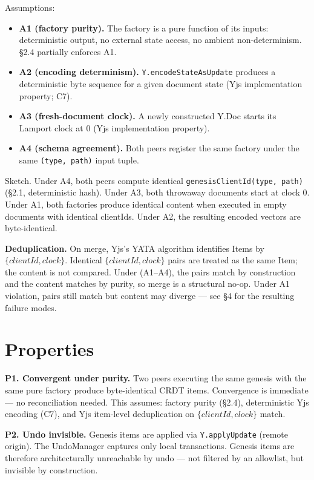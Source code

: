 Assumptions:
\begin{itemize}
    \item \textbf{A1 (factory purity).} The factory is a pure function of its inputs: deterministic output, no external state access, no ambient non-determinism. \S2.4 partially enforces A1.
    \item \textbf{A2 (encoding determinism).} \texttt{Y.encodeStateAsUpdate} produces a deterministic byte sequence for a given document state (Yjs implementation property; C7).
    \item \textbf{A3 (fresh-document clock).} A newly constructed Y.Doc starts its Lamport clock at 0 (Yjs implementation property).
    \item \textbf{A4 (schema agreement).} Both peers register the same factory under the same \texttt{(type, path)} input tuple.
\end{itemize}

Sketch. Under A4, both peers compute identical \texttt{genesisClientId(type, path)} (\S2.1, deterministic hash). Under A3, both throwaway documents start at clock 0. Under A1, both factories produce identical content when executed in empty documents with identical clientIds. Under A2, the resulting encoded vectors are byte-identical.

\textbf{Deduplication.} On merge, Yjs's YATA algorithm identifies Items by $\{\mathit{clientId}, \mathit{clock}\}$. Identical $\{\mathit{clientId}, \mathit{clock}\}$ pairs are treated as the same Item\cite{yata2016}; the content is not compared. Under (A1--A4), the pairs match by construction and the content matches by purity, so merge is a structural no-op. Under A1 violation, pairs still match but content may diverge --- see \S4 for the resulting failure modes.

\section{Properties}

\textbf{P1. Convergent under purity.} Two peers executing the same genesis with the same pure factory produce byte-identical CRDT items. Convergence is immediate --- no reconciliation needed. This assumes: factory purity (\S2.4), deterministic Yjs encoding (C7), and Yjs item-level deduplication on $\{\mathit{clientId}, \mathit{clock}\}$ match\cite{yata2016}.

\textbf{P2. Undo invisible.} Genesis items are applied via \texttt{Y.applyUpdate} (remote origin). The UndoManager captures only local transactions\cite{yata2016}. Genesis items are therefore architecturally unreachable by undo --- not filtered by an allowlist, but invisible by construction.

